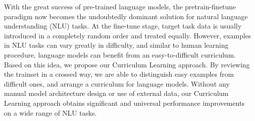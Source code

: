 With the great success of pre-trained language models, the pretrain-finetune paradigm now becomes the undoubtedly dominant solution for natural language understanding (NLU) tasks. At the fine-tune stage, target task data is usually introduced in a completely random order and treated equally. However, examples in NLU tasks can vary greatly in difficulty, and similar to human learning procedure, language models can benefit from an easy-to-difficult curriculum. Based on this idea, we propose our Curriculum Learning approach. By reviewing the trainset in a crossed way, we are able to distinguish easy examples from difficult ones, and arrange a curriculum for language models. Without any manual model architecture design or use of external data, our Curriculum Learning approach obtains significant and universal performance improvements on a wide range of NLU tasks.
